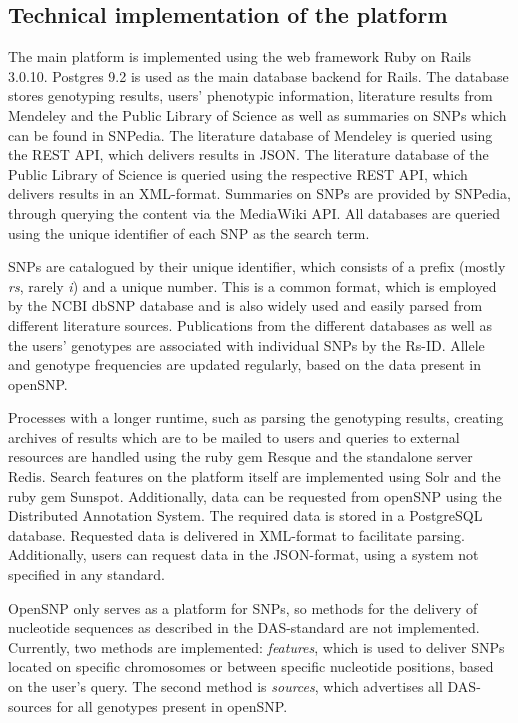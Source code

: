 \documentclass[10pt]{article}
\begin{document}
\subsection*{Technical implementation of the platform}
The main platform is implemented using the web framework Ruby on Rails 3.0.10. Postgres 9.2 is used as the main database backend for Rails. 
The database stores genotyping results, users' phenotypic information, literature results from Mendeley and the Public Library of Science as well as summaries on SNPs 
which can be found in SNPedia. The literature database of Mendeley is queried using the REST API, which delivers results in JSON. The literature database of 
the Public Library of Science is queried using the respective REST API, which delivers results in an XML-format. Summaries on SNPs are provided by SNPedia, 
through querying the content via the MediaWiki API. All databases are queried using the unique identifier of each SNP as the search term. 

SNPs are catalogued by their unique identifier, which consists of a prefix (mostly \textit{rs}, rarely \textit{i}) and a unique number. This is a common format, 
which is employed by the NCBI dbSNP database \cite{Sherry2001} and is also widely used and easily parsed from different literature sources. Publications from the different databases as 
well as the users' genotypes are associated with individual SNPs by the Rs-ID. Allele and genotype frequencies are updated regularly, based on the data present in openSNP. 

Processes with a longer runtime, such as parsing the genotyping results, creating archives of results which are to be mailed to users and queries to external resources 
are handled using the ruby gem Resque and the standalone server Redis. Search features on the platform itself are implemented using Solr and the ruby gem Sunspot. 
Additionally, data can be requested from openSNP using the Distributed Annotation System. The required data is stored in a PostgreSQL database.  
Requested data is delivered in XML-format to facilitate parsing. Additionally, users can request data in the JSON-format, using a system not specified in any standard.

OpenSNP only serves as a platform for SNPs, so methods for the delivery of nucleotide sequences as described in the DAS-standard are not implemented. Currently, 
two methods are implemented: \textit{features}, which is used to deliver SNPs located on specific chromosomes or between specific nucleotide positions, 
based on the user's query. The second method is \textit{sources}, which advertises all DAS-sources for all genotypes present in openSNP.
\end{document}
